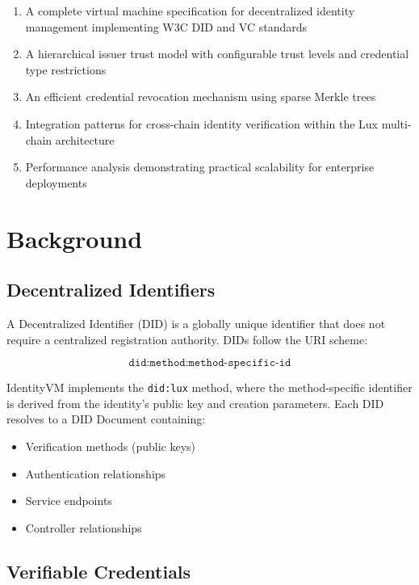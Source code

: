 \documentclass[11pt,twocolumn]{article}
\begin{document}
\begin{enumerate}
\item A complete virtual machine specification for decentralized identity management implementing W3C DID and VC standards
\item A hierarchical issuer trust model with configurable trust levels and credential type restrictions
\item An efficient credential revocation mechanism using sparse Merkle trees
\item Integration patterns for cross-chain identity verification within the Lux multi-chain architecture
\item Performance analysis demonstrating practical scalability for enterprise deployments
\end{enumerate}

\section{Background}

\subsection{Decentralized Identifiers}

A Decentralized Identifier (DID) is a globally unique identifier that does not require a centralized registration authority. DIDs follow the URI scheme:

\begin{equation}
\texttt{did:method:method-specific-id}
\end{equation}

IdentityVM implements the \texttt{did:lux} method, where the method-specific identifier is derived from the identity's public key and creation parameters. Each DID resolves to a DID Document containing:

\begin{itemize}
\item Verification methods (public keys)
\item Authentication relationships
\item Service endpoints
\item Controller relationships
\end{itemize}

\subsection{Verifiable Credentials}
\end{document}

